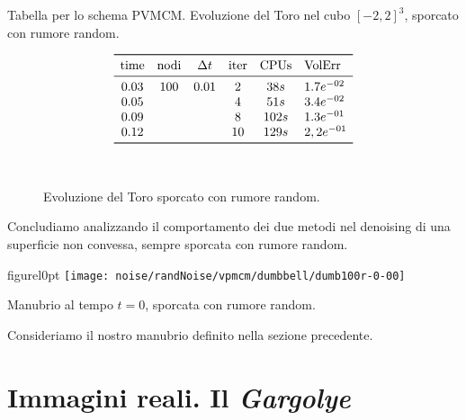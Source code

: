 \begin{table}[htb!]
\caption{Tabella per lo schema PVMCM. Evoluzione del Toro nel cubo
  $[-2,2]^3$, sporcato con rumore random.}
\label{tab:cp4-sc2-1-02}
\[
\begin{array}{*{5}{c}l}
    \toprule
    \text{time} &\text{nodi} &\Delta t &\text{iter} &\text{CPUs}&\text{VolErr} \\
    \midrule
     0.03       & 100        & 0.01    & 2          & 38s      &1.7e^{-02}\\
     0.05       &            &         & 4          & 51s      &3.4e^{-02}\\ 
     0.09       &            &         & 8          & 102s     &1.3e^{-01}\\ 
     0.12       &            &         & 10         & 129s     &2,2e^{-01}\\
     \bottomrule
\end{array}
\]
\end{table}

\begin{figure}[htb!]
  \centering
  \quad
  \\
  \quad
  \quad
  \caption{Evoluzione del Toro sporcato con rumore random.}
  \label{fig:cp4-sc1-02}
\end{figure}
\newpage

Concludiamo analizzando il comportamento dei due metodi nel denoising
di una superficie non convessa, sempre sporcata con rumore random.

\begin{wrapfloat}{figure}{l}{0pt}
\texttt{[image: noise/randNoise/vpmcm/dumbbell/dumb100r-0-00]}
\caption{Manubrio al tempo $t=0$, sporcata con rumore random.}
\end{wrapfloat}

Consideriamo il nostro manubrio definito nella sezione
precedente. 

%
\newpage
\section{Immagini reali. Il \emph{Gargolye}}
